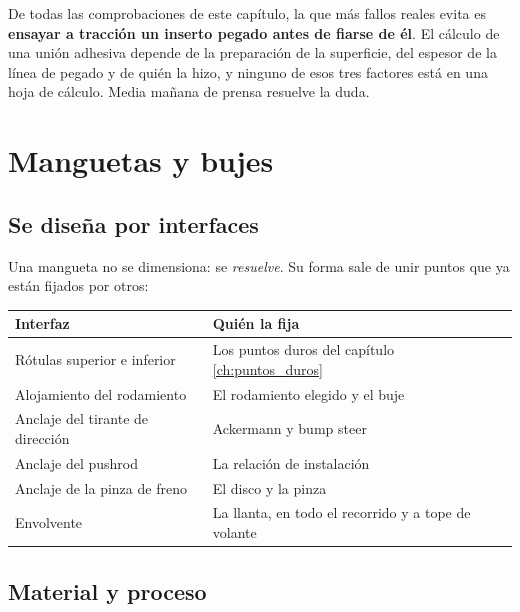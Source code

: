 \begin{clave}
De todas las comprobaciones de este capítulo, la que más fallos reales evita es
\textbf{ensayar a tracción un inserto pegado antes de fiarse de él}. El cálculo
de una unión adhesiva depende de la preparación de la superficie, del espesor de
la línea de pegado y de quién la hizo, y ninguno de esos tres factores está en
una hoja de cálculo. Media mañana de prensa resuelve la duda.
\end{clave}

\section{Manguetas y bujes}
\label{sec:componentes_suspension:03}

\subsection{Se diseña por interfaces}

Una mangueta no se dimensiona: se \emph{resuelve}. Su forma sale de unir puntos
que ya están fijados por otros:

\begin{center}
\begin{tabularx}{\textwidth}{@{}lX@{}}
\toprule
\textbf{Interfaz} & \textbf{Quién la fija} \\
\midrule
Rótulas superior e inferior & Los puntos duros del capítulo \ref{ch:puntos_duros} \\
Alojamiento del rodamiento & El rodamiento elegido y el buje \\
Anclaje del tirante de dirección & Ackermann y bump steer \\
Anclaje del pushrod & La relación de instalación \\
Anclaje de la pinza de freno & El disco y la pinza \\
Envolvente & La llanta, en todo el recorrido y a tope de volante \\
\bottomrule
\end{tabularx}
\end{center}

\subsection{Material y proceso}

